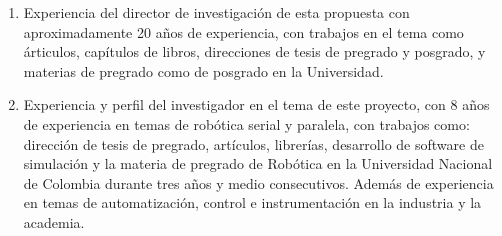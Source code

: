 \begin{itemize}
\begin{enumerate}[1)]
  \item Experiencia del director de investigaci\'on de esta propuesta con aproximadamente 20 a\~nos de experiencia, con trabajos en el tema como \'articulos\cite{Heredia2007}, cap\'itulos de libros\cite{M2005,M2005a}, direcciones de tesis de pregrado y posgrado, y materias de pregrado como de posgrado en la Universidad.
  \item Experiencia y perfil del investigador en el tema de este proyecto, con 8 a\~nos de experiencia en temas de rob\'otica serial y paralela, con trabajos como: direcci\'on de tesis de pregrado\cite{Cortes2009,Valencia2009,Barragan2009,Silva2009}, art\'iculos\cite{Castillo2007}, librer\'ias\cite{Castillo2008}, desarrollo de software de simulaci\'on\cite{Castillo2010} y la materia de pregrado de Rob\'otica en la Universidad Nacional de Colombia durante tres a\~nos y medio consecutivos. Adem\'as de experiencia en temas de automatizaci\'on, control e instrumentaci\'on en la industria y la academia.
  \end{enumerate}
\end{itemize}

